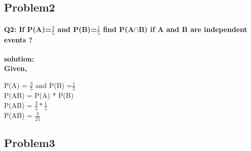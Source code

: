 \documentclass[10pt, a4paper]{article}
\begin{document}
\subsection{Problem2}
\paragraph{Q2: If P(A)=$\frac{3}{5}$ and P(B)=$\frac{1}{5}$ find P(A$\cap$B) if A and B are independent events ?\\}
\textbf{solution:}\\
\textbf{Given,}
\begin{center}
P(A) = $\frac{3}{5}$ and P(B) =$\frac{1}{5}$\\
P(AB) = P(A) * P(B)\\
P(AB) = $\frac{3}{5}*\frac{1}{5}$\\
P(AB) = $\frac{3}{25}$
\end{center}
\subsection{Problem3}
\end{document}
